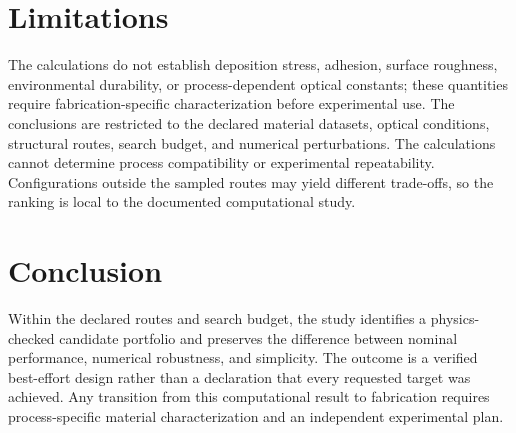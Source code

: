 \hypertarget{limitations}{%
\section{Limitations}\label{limitations}}

The calculations do not establish deposition stress, adhesion, surface roughness, environmental durability, or process-dependent optical constants; these quantities require fabrication-specific characterization before experimental use. The conclusions are restricted to the declared material datasets, optical conditions, structural routes, search budget, and numerical perturbations. The calculations cannot determine process compatibility or experimental repeatability. Configurations outside the sampled routes may yield different trade-offs, so the ranking is local to the documented computational study.

\hypertarget{conclusion}{%
\section{Conclusion}\label{conclusion}}

Within the declared routes and search budget, the study identifies a physics-checked candidate portfolio and preserves the difference between nominal performance, numerical robustness, and simplicity. The outcome is a verified best-effort design rather than a declaration that every requested target was achieved. Any transition from this computational result to fabrication requires process-specific material characterization and an independent experimental plan.
